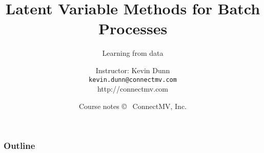 \documentclass[handout, 12pt]{beamer}
\title[]{Latent Variable Methods for Batch Processes}
\subtitle[]{Learning from data}
\author[]{Instructor: Kevin Dunn \\{\tt kevin.dunn@connectmv.com}\\ http://connectmv.com}
\institute[]{}
\date[]{Course notes \copyright~ ConnectMV, Inc. \\ \vspace{1cm}{\footnotesize Presented at GSK, Mississauga, February 2011}}
\begin{document}
\begin{frame} \titlepage \end{frame}

%
%

\begin{frame}\frametitle{Outline}
\tableofcontents
\end{frame}


























\end{document}
